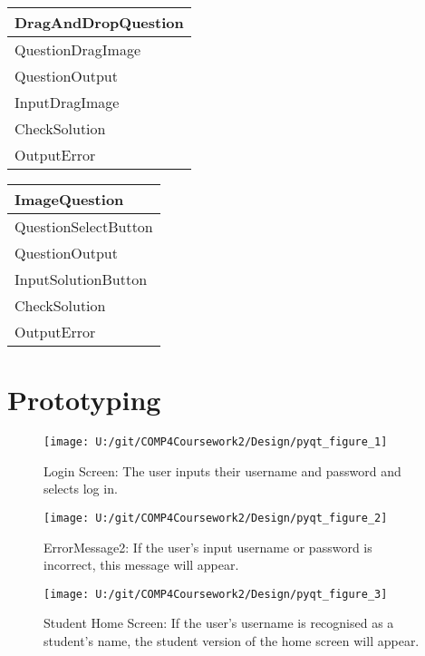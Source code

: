 \begin{center}
\begin{tabular}{|p{5cm}|} \hline
DragAndDropQuestion \\ \hline
QuestionDragImage \\ 
QuestionOutput \\ \hline
InputDragImage \\ 
CheckSolution \\
OutputError \\ \hline
\end{tabular}
\end{center}

\begin{center}
\begin{tabular}{|p{5cm}|} \hline
ImageQuestion \\ \hline
QuestionSelectButton \\ 
QuestionOutput \\ \hline
InputSolutionButton \\ 
CheckSolution \\
OutputError \\ \hline
\end{tabular}
\end{center}

\section{Prototyping}

\begin{figure}[H]
    \label{fig:print_function_result}\caption{Login Screen: The user inputs their username and password and selects log in.}
    \texttt{[image: U:/git/COMP4Coursework2/Design/pyqt\_figure\_1]}
\end{figure}

\begin{figure}[H]
    \label{fig:print_function_result}\caption{ErrorMessage2: If the user's input username or password is incorrect, this message will appear.}
    \texttt{[image: U:/git/COMP4Coursework2/Design/pyqt\_figure\_2]}
\end{figure}

\begin{figure}[H]
    \label{fig:print_function_result}\caption{Student Home Screen: If the user's username is recognised as a student's name, the student version of the home screen will appear.}
    \texttt{[image: U:/git/COMP4Coursework2/Design/pyqt\_figure\_3]}
\end{figure}

